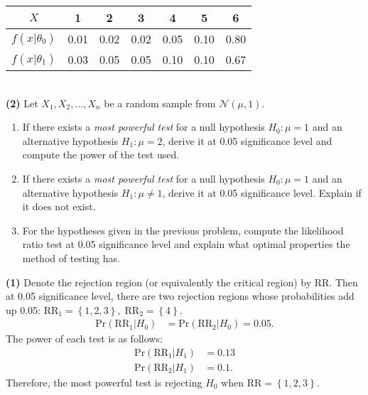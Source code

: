 \documentclass[answers]{exam}
\begin{document}
\begin{questions}
\begin{table}[!htbp]
\begin{tabular}{*7c}
          $X$ & 1 & 2 & 3 & 4 & 5 & 6\\
          \midrule
          $f\left(x|\theta_{0}\right)$ & 0.01 & 0.02 & 0.02 & 0.05 & 0.10 & 0.80\\
          $f\left(x|\theta_{1}\right)$ & 0.03 & 0.05 & 0.05 & 0.10 & 0.10 & 0.67\\
          \bottomrule
        \end{tabular}
      \end{table}\\
      \textbf{(2)} Let $X_{1}, X_{2}, \ldots , X_{n}$ be a random sample from $\mathcal{N}\left(\mu,1\right)$.
      \begin{enumerate}[label=(\alph*)]
         \item If there exists a \emph{most powerful test} for a null hypothesis $H_{0}: \mu = 1$ and an alternative hypothesis $H_{1}:\mu=2$, derive it at 0.05 significance level and compute the power of the test used.
         \item If there exists a \emph{most powerful test} for a null hypothesis $H_{0}: \mu =1$ and an alternative hypothesis $H_{1}:\mu\neq 1$, derive it at 0.05 significance level. Explain if it does not exist.
         \item For the hypotheses given in the previous problem, compute the likelihood ratio test at 0.05 significance level and explain what optimal properties the method of testing has.
      \end{enumerate}
      \begin{solution}
         \textbf{(1)} Denote the rejection region (or equivalently the critical region) by $\mathrm{RR}$. Then at 0.05 significance level, there are two rejection regions whose probabilities add up 0.05: $\mathrm{RR}_{1}=\left\{1, 2, 3\right\},\; \mathrm{RR}_{2}=\left\{4\right\}$.
         \begin{align}
            \mathrm{Pr}\left(\mathrm{RR}_{1}|H_{0}\right) &= \mathrm{Pr}\left(\mathrm{RR}_{2}|H_{0}\right) = 0.05.
         \end{align}
         The power of each test is as follows:
         \begin{align}
            \mathrm{Pr}\left(\mathrm{RR}_{1}|H_{1}\right) &= 0.13\\
            \mathrm{Pr}\left(\mathrm{RR}_{2}|H_{1}\right) &= 0.1.
         \end{align}
         Therefore, the most powerful test is rejecting $H_{0}$ when $\mathrm{RR}=\left\{1,2,3\right\}$.
      \end{solution}

\end{questions}
\end{document}
